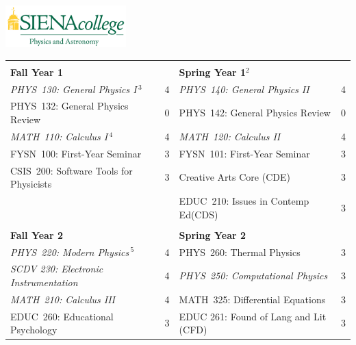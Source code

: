 \documentclass[12pt]{article}
\begin{document}
\hfill \includegraphics[width=0.35\textwidth]{siena_phys_astro_print_crop.jpg}

\vspace{0.1cm}
\vspace{0.3cm}

\vspace*{-5mm}
\begin{table}[h!]
\begin{center}
{\renewcommand{\arraystretch}{1.2}
\begin{tabular*}{0.9\textwidth}{@{\extracolsep{\fill}}lclc}
 & \\
{\Large \textbf{Fall Year 1}} & & {\Large \textbf{Spring Year 1$^{2}$}} & \\
\hline
{\em PHYS~130: General Physics I}\,$^{3}$  & 4 & {\em PHYS~140: General Physics II}     & 4 \\
PHYS~132: General Physics Review           & 0 & PHYS~142: General Physics Review & 0\\
{\em MATH~110: Calculus I}\,$^{4}$         & 4 & {\em MATH~120: Calculus II}            & 4 \\
FYSN~100: First-Year Seminar               & 3 & FYSN~101: First-Year Seminar     & 3\\
CSIS~200: Software Tools for Physicists    & 3 & Creative Arts Core (CDE)         & 3 \\
								& & EDUC~210: Issues in Contemp Ed(CDS) & 3\\

 & \\
{\Large \textbf{Fall Year 2}} & & {\Large \textbf{Spring Year 2}} & \\
\hline
{\em PHYS~220: Modern Physics}\,$^{5}$      & 4 & PHYS~260: Thermal Physics        & 3 \\
{\em SCDV 230: Electronic Instrumentation} & 4 & {\em PHYS~250: Computational Physics} & 3  \\
{\em MATH~210: Calculus III}               & 4 & MATH~325: Differential Equations & 3 \\
EDUC~260: Educational Psychology                        & 3 & EDUC 261: Found of Lang and Lit (CFD) &3 \\


\end{tabular*}}
\end{center}
\end{table}
\end{document}
